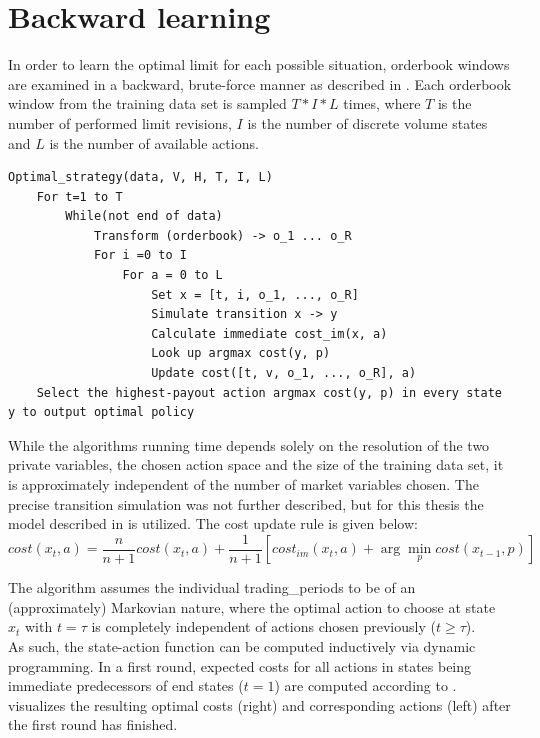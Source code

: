 \section{Backward learning}
\label{chap:backwardlearning}
In order to learn the optimal limit for each possible situation, orderbook windows are examined in a backward, brute-force manner as described in . Each orderbook window from the training data set is sampled $T*I*L$ times, where $T$ is the number of performed limit revisions, $I$ is the number of discrete volume states and $L$ is the number of available actions.

\begin{lstlisting}[frame=single, breaklines=true, basicstyle=\scriptsize, caption=Brute-Force strategy learning approach as described in \Cite{Nevmyvaka:2006}., label=lst:bruteforce:pseudocode]
Optimal_strategy(data, V, H, T, I, L)
    For t=1 to T
        While(not end of data)
            Transform (orderbook) -> o_1 ... o_R
            For i =0 to I
                For a = 0 to L
                    Set x = [t, i, o_1, ..., o_R]
                    Simulate transition x -> y
                    Calculate immediate cost_im(x, a)
                    Look up argmax cost(y, p)
                    Update cost([t, v, o_1, ..., o_R], a)
    Select the highest-payout action argmax cost(y, p) in every state y to output optimal policy
\end{lstlisting}

While the algorithms running time depends solely on the resolution of the two private variables, the chosen action space and the size of the training data set, it is approximately independent of the number of market variables chosen. The precise transition simulation was not further described, but for this thesis the model described in  is utilized. The cost update rule is given below: 
\begin{equation}\label{eq:costfunction}
   cost(x_t, a) = \dfrac{n}{n+1} cost(x_t, a) + \dfrac{1}{n+1} [cost_{im}(x_t,a) + \arg\min_{p}cost(x_{t-1}, p)]
\end{equation}

The algorithm assumes the individual trading\_periods to be of an (approximately) Markovian nature, where the optimal action to choose at state $x_t$ with $t = \tau$ is completely independent of actions chosen previously ($t \geq \tau$).\\

As such, the state-action function can be computed inductively via dynamic programming. In a first round, expected costs for all actions in states being immediate predecessors of end states (\ie $t=1$) are computed according to .  visualizes the resulting optimal costs (right) and corresponding actions (left) after the first round has finished.

